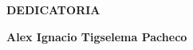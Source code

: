 \newpage
\vspace*{\fill}
\begin{flushright}
  \footnotesize
	\begin{minipage}{0.5\textwidth}
		\begin{flushright}
			\uppercase{\textbf{Dedicatoria}}
		\end{flushright}
		\itshape

		\bigbreak
		\begin{flushright}
			\textbf{Alex Ignacio Tigselema Pacheco}
		\end{flushright}
	\end{minipage}
\end{flushright}
\vspace*{\fill}
